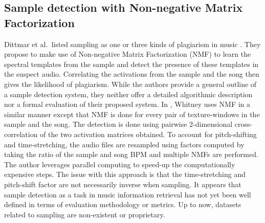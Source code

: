 \documentclass{article}
\begin{document}
\subsection{Sample detection with Non-negative Matrix Factorization}
%
Dittmar et al.\ listed sampling as one or three kinds of plagiarism in music \cite{dittmar2012audio}. They propose to make use of Non-negative Matrix Factorization (NMF) to learn the spectral templates from the sample and detect the presence of these templates in the suspect audio. Correlating the activations from the sample and the song then gives the likelihood of plagiarism. While the authors provide a general outline of a sample detection system, they neither offer a detailed algorithmic description nor a formal evaluation of their proposed system.
In \cite{whitney2013automatic}, Whitney uses NMF in a similar manner except that NMF is done for every pair of texture-windows in the sample and the song. The detection is done using pairwise 2-dimensional cross-correlation of the two activation matrices obtained. To account for pitch-shifting and time-stretching, the audio files are resampled using factors computed by taking the ratio of the sample and song BPM and multiple NMFs are performed. The author leverages parallel computing to speed-up the computationally expensive steps. The issue with this approach is that the time-stretching and pitch-shift factor are not necessarily inverse when sampling.
%
It appears that sample detection as a task in music information retrieval has not yet been well defined in terms of evaluation methodology or metrics. Up to now, datasets related to sampling are non-existent or proprietary.
\end{document}

